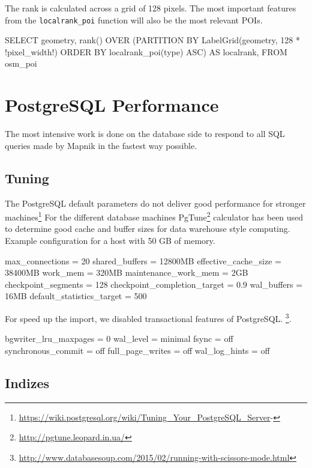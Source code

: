The rank is calculated across a grid of 128 pixels. The most
important features from the \texttt{localrank\_poi} function will
also be the most relevant POIs.

\begin{sqlcode}
SELECT
  geometry,
  rank() OVER (PARTITION BY LabelGrid(geometry, 128 * !pixel_width!)
               ORDER BY localrank_poi(type) ASC) AS localrank,
FROM osm_poi
\end{sqlcode}

\section{PostgreSQL Performance}
\label{postgres-performance}

The most intensive work is done on the database side to respond to all SQL queries made by Mapnik in the fastest way possible.

\subsection{Tuning}

The PostgreSQL default parameters do not deliver good performance for stronger machines\footnote{\url{https://wiki.postgresql.org/wiki/Tuning_Your_PostgreSQL_Server}-}
For the different database machines PgTune\footnote{\url{http://pgtune.leopard.in.ua/}} calculator has been used to determine good cache and buffer sizes for data warehouse style computing.
\\
Example configuration for a host with 50 GB of memory.

\begin{bashcode}
max_connections = 20
shared_buffers = 12800MB
effective_cache_size = 38400MB
work_mem = 320MB
maintenance_work_mem = 2GB
checkpoint_segments = 128
checkpoint_completion_target = 0.9
wal_buffers = 16MB
default_statistics_target = 500
\end{bashcode}

For speed up the import, we disabled transactional features of PostgreSQL. \footnote{\url{http://www.databasesoup.com/2015/02/running-with-scissors-mode.html}}.

\begin{bashcode}
bgwriter_lru_maxpages = 0
wal_level = minimal
fsync = off
synchronous_commit = off
full_page_writes = off
wal_log_hints = off
\end{bashcode}

\subsection{Indizes}

